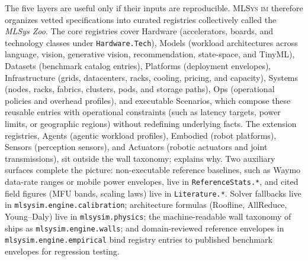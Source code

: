 \documentclass[10pt,twocolumn]{article}
\newcommand{\mlsysim}{\mbox{\textsc{MLSys}\,\textperiodcentered\,\textsc{im}}\xspace}
\begin{document}
The five layers are useful only if their inputs are reproducible. \mlsysim therefore organizes vetted specifications into \CountRegistriesCurated{} curated registries collectively called the \emph{MLSys Zoo}. The \CountRegistriesCore{} core registries cover Hardware (accelerators, boards, and technology classes under \texttt{Hardware.Tech}), Models (workload architectures across language, vision, generative vision, recommendation, state-space, and TinyML), Datasets (benchmark catalog entries), Platforms (deployment envelopes), Infrastructure (grids, datacenters, racks, cooling, pricing, and capacity), Systems (nodes, racks, fabrics, clusters, pods, and storage paths), Ops (operational policies and overhead profiles), and executable Scenarios, which compose these reusable entries with operational constraints (such as latency targets, power limits, or geographic regions) without redefining underlying facts. The extension registries, Agents (agentic workload profiles), Embodied (robot platforms), Sensors (perception sensors), and Actuators (robotic actuators and joint transmissions), sit outside the wall taxonomy;  explains why. Two auxiliary surfaces complete the picture: non-executable reference baselines, such as Waymo data-rate ranges or mobile power envelopes, live in \texttt{ReferenceStats.*}, and cited field figures (MFU bands, scaling laws) live in \texttt{Literature.*}. Solver fallbacks live in \texttt{mlsysim.engine.calibration}; architecture formulas (Roofline, AllReduce, Young--Daly) live in \texttt{mlsysim.physics}; the machine-readable wall taxonomy of  ships as \texttt{mlsysim.engine.walls}; and domain-reviewed reference envelopes in \texttt{mlsysim.engine.empirical} bind registry entries to published benchmark envelopes for regression testing.
\end{document}
